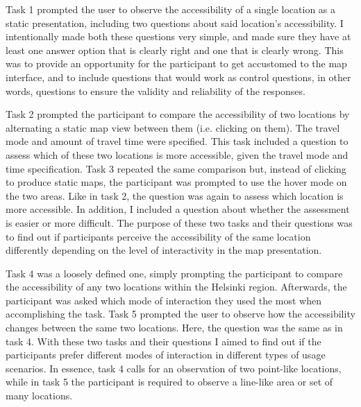 Task 1 prompted the user to observe the accessibility of
a single location as a static presentation,
including two questions about said location's accessibility.
I intentionally made both these questions very simple,
and made sure they have at least one answer option that is clearly right
and one that is clearly wrong.
This was to provide an opportunity for the participant to get accustomed to the map interface,
and to include questions that would work as control questions,
in other words, questions to ensure the validity and reliability of the responses.

Task 2 prompted the participant to compare
the accessibility of two locations
by alternating a static map view between them (i.e. clicking on them).
The travel mode and amount of travel time were specified.
This task included a question to assess
which of these two locations is more accessible,
given the travel mode and time specification.
Task 3 repeated the same comparison but,
instead of clicking to produce static maps,
the participant was prompted to use the hover mode on the two areas.
Like in task 2,
the question was again to assess which location is more accessible.
In addition,
I included a question about whether the assessment is easier or more difficult.
The purpose of these two tasks and their questions was
to find out if participants perceive the accessibility of
the same location differently depending on
the level of interactivity in the map presentation.

Task 4 was a loosely defined one, simply prompting the participant to
compare the accessibility of any two locations within the Helsinki region.
Afterwards, the participant was asked
which mode of interaction they used the most when accomplishing the task.
Task 5 prompted the user to observe how the accessibility changes
between the same two locations. Here, the question was the same as in task 4.
With these two tasks and their questions I aimed to find out
if the participants prefer different modes of interaction
in different types of usage scenarios.
In essence, task 4 calls for an observation of two point-like locations,
while in task 5 the participant is required to
observe a line-like area or set of many locations.

